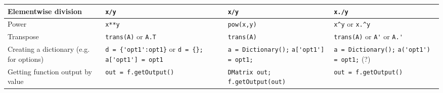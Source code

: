 \documentclass[a4paper,12pt]{book}
\begin{document}
\begin{center}
\begin{tabular}{| p{3.5cm} | p{3.5cm} | p{3.5cm} | p{3.5cm} | }
    Elementwise division & \verb|x/y| & \verb|x/y| & \verb|x./y| \\ \hline
    Power & \verb|x**y| & \verb|pow(x,y)| & \verb|x^y| or \verb|x.^y| \\ \hline
    Transpose & \verb|trans(A)| or \verb|A.T| & \verb|trans(A)| & \verb|trans(A)| or \verb|A'| or \verb|A.'| \\ \hline
    Creating a dictionary (e.g. for options) & \verb|d = {'opt1':opt1}| or \verb|d = {}; a['opt1'] = opt1| & \verb|a = Dictionary();| \verb|a['opt1'] = opt1;| & \verb|a = Dictionary();| \verb|a('opt1') = opt1;| (?) \\ \hline
    Getting function output by value & \verb|out = f.getOutput()| & \verb|DMatrix out; f.getOutput(out) | & \verb|out = f.getOutput()| \\ \hline
  \end{tabular}
\end{center}

%
%
\end{document}
